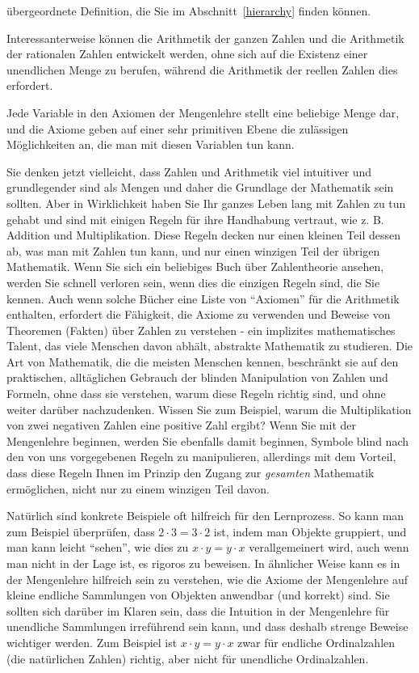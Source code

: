 übergeordnete Definition, die Sie im Abschnitt~\ref{hierarchy} finden können.

Interessanterweise können die Arithmetik der ganzen Zahlen und die Arithmetik der rationalen Zahlen entwickelt werden, ohne sich auf die Existenz einer unendlichen Menge zu berufen, während die Arithmetik der reellen Zahlen dies erfordert.

Jede Variable in den Axiomen der Mengenlehre stellt eine beliebige Menge dar, und die Axiome geben auf einer sehr primitiven Ebene die zulässigen Möglichkeiten an, die man mit diesen Variablen tun kann.

Sie denken jetzt vielleicht, dass Zahlen und Arithmetik viel intuitiver und grundlegender sind als Mengen und daher die Grundlage der Mathematik sein sollten. Aber in Wirklichkeit haben Sie Ihr ganzes Leben lang mit Zahlen zu tun gehabt und sind mit einigen Regeln für ihre Handhabung vertraut, wie z. B. Addition und Multiplikation.  Diese Regeln decken nur einen kleinen Teil dessen ab, was man mit Zahlen tun kann, und nur einen winzigen Teil der übrigen Mathematik.  Wenn Sie sich ein beliebiges Buch über Zahlentheorie ansehen, werden Sie schnell verloren sein, wenn dies die einzigen Regeln sind, die Sie kennen.  Auch wenn solche Bücher eine Liste von "`Axiomen"' für die Arithmetik enthalten, erfordert die Fähigkeit, die Axiome zu verwenden und Beweise von Theoremen (Fakten) über Zahlen zu verstehen - ein implizites mathematisches Talent, das viele Menschen davon abhält, abstrakte Mathematik zu studieren.  Die Art von Mathematik, die die meisten Menschen kennen, beschränkt sie auf den praktischen, alltäglichen Gebrauch der blinden Manipulation von Zahlen und Formeln, ohne dass sie verstehen, warum diese Regeln richtig sind, und ohne weiter darüber nachzudenken.  Wissen Sie zum Beispiel, warum die Multiplikation von zwei negativen Zahlen eine positive Zahl ergibt?  Wenn Sie mit der Mengenlehre beginnen, werden Sie ebenfalls damit beginnen, Symbole blind nach den von uns vorgegebenen Regeln zu manipulieren, allerdings mit dem Vorteil, dass diese Regeln Ihnen im Prinzip den Zugang zur {\em gesamten} Mathematik ermöglichen, nicht nur zu einem winzigen Teil davon.

Natürlich sind konkrete Beispiele oft hilfreich für den Lernprozess. So kann man zum Beispiel überprüfen, dass $2\cdot 3=3 \cdot 2$ ist, indem man Objekte gruppiert, und man kann leicht "`sehen"', wie dies zu $x\cdot y = y\cdot x$ verallgemeinert wird, auch wenn man nicht in der Lage ist, es rigoros zu beweisen.  In ähnlicher Weise kann es in der Mengenlehre hilfreich sein zu verstehen, wie die Axiome der Mengenlehre auf kleine endliche Sammlungen von Objekten anwendbar (und korrekt) sind.  Sie sollten sich darüber im Klaren sein, dass die Intuition in der Mengenlehre für unendliche Sammlungen irreführend sein kann, und dass deshalb strenge Beweise wichtiger werden.  Zum Beispiel ist $x\cdot y = y\cdot x$ zwar für endliche Ordinalzahlen (die natürlichen Zahlen) richtig, aber nicht für unendliche Ordinalzahlen.

